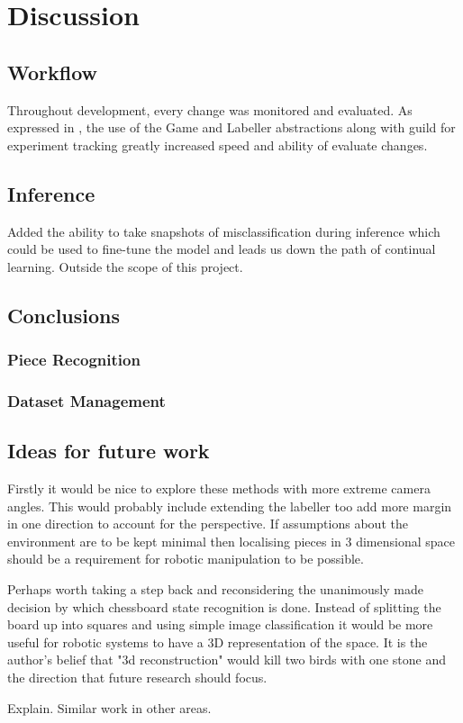 \chapter{Discussion}
\label{conclusions}

\section{Workflow}
Throughout development, every change was monitored and evaluated.  As expressed in , the use of the Game and Labeller
abstractions along with guild for experiment tracking greatly increased speed and ability of evaluate changes. 

\section{Inference}
Added the ability to take snapshots of misclassification during inference which could be used to fine-tune the model and leads us down the 
path of continual learning.  Outside the scope of this project.
\section{Conclusions}

\subsection{Piece Recognition}

\subsection{Dataset Management}

\section{Ideas for future work}
Firstly it would be nice to explore these methods with more extreme camera angles.  This would probably include extending the labeller too add more 
margin in one direction to account for the perspective. If assumptions about the environment are to be kept minimal
then localising pieces in 3 dimensional space should be a requirement for robotic manipulation to be possible.

Perhaps worth taking a step back and reconsidering the unanimously made decision by which chessboard state recognition is done.  Instead of splitting 
the board up into squares and using simple image classification it would be more useful for robotic systems to have a 3D representation of the space.
It is the author's belief that "3d reconstruction" would kill two birds with one stone and the direction that future research should focus. 

Explain.  Similar work in other areas.